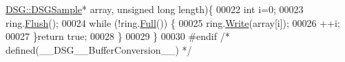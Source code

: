 \begin{DoxyCode}
      \hyperlink{namespace_d_s_g_ac39a94cd27ebcd9c1e7502d0c624894a}{DSG::DSGSample}* array, \textcolor{keywordtype}{unsigned} \textcolor{keywordtype}{long} length)\{
00022         \textcolor{keywordtype}{int} i=0;
00023         ring.\hyperlink{class_d_s_g_1_1_ring_buffer_ab23c8003d2857809a816068eeb209d60}{Flush}();
00024         \textcolor{keywordflow}{while} (!ring.\hyperlink{class_d_s_g_1_1_ring_buffer_a53ddb04ffcbb5470a8d2b0a3c65b70cb}{Full}()) \{
00025             ring.\hyperlink{class_d_s_g_1_1_ring_buffer_aa5dd2caa0a270173251faee40a43d692}{Write}(array[i]);
00026             ++i;
00027         \}\textcolor{keywordflow}{return} \textcolor{keyword}{true};
00028     \}
00029 \}
00030 \textcolor{preprocessor}{#endif }\textcolor{comment}{/* defined(\_\_DSG\_\_BufferConversion\_\_) */}\textcolor{preprocessor}{}
\end{DoxyCode}
